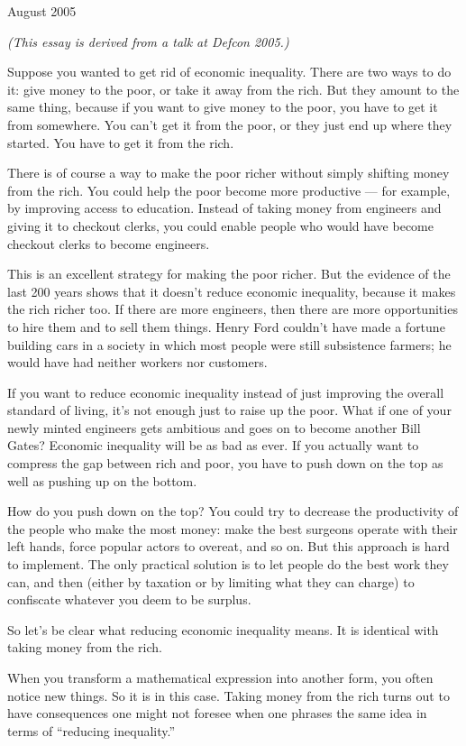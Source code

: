 August 2005

\emph{(This essay is derived from a talk at Defcon 2005.)}

Suppose you wanted to get rid of economic inequality. There are two ways
to do it: give money to the poor, or take it away from the rich. But
they amount to the same thing, because if you want to give money to the
poor, you have to get it from somewhere. You can't get it from the poor,
or they just end up where they started. You have to get it from the
rich.

There is of course a way to make the poor richer without simply shifting
money from the rich. You could help the poor become more productive ---
for example, by improving access to education. Instead of taking money
from engineers and giving it to checkout clerks, you could enable people
who would have become checkout clerks to become engineers.

This is an excellent strategy for making the poor richer. But the
evidence of the last 200 years shows that it doesn't reduce economic
inequality, because it makes the rich richer too. If there are more
engineers, then there are more opportunities to hire them and to sell
them things. Henry Ford couldn't have made a fortune building cars in a
society in which most people were still subsistence farmers; he would
have had neither workers nor customers.

If you want to reduce economic inequality instead of just improving the
overall standard of living, it's not enough just to raise up the poor.
What if one of your newly minted engineers gets ambitious and goes on to
become another Bill Gates? Economic inequality will be as bad as ever.
If you actually want to compress the gap between rich and poor, you have
to push down on the top as well as pushing up on the bottom.

How do you push down on the top? You could try to decrease the
productivity of the people who make the most money: make the best
surgeons operate with their left hands, force popular actors to overeat,
and so on. But this approach is hard to implement. The only practical
solution is to let people do the best work they can, and then (either by
taxation or by limiting what they can charge) to confiscate whatever you
deem to be surplus.

So let's be clear what reducing economic inequality means. It is
identical with taking money from the rich.

When you transform a mathematical expression into another form, you
often notice new things. So it is in this case. Taking money from the
rich turns out to have consequences one might not foresee when one
phrases the same idea in terms of ``reducing inequality.''


